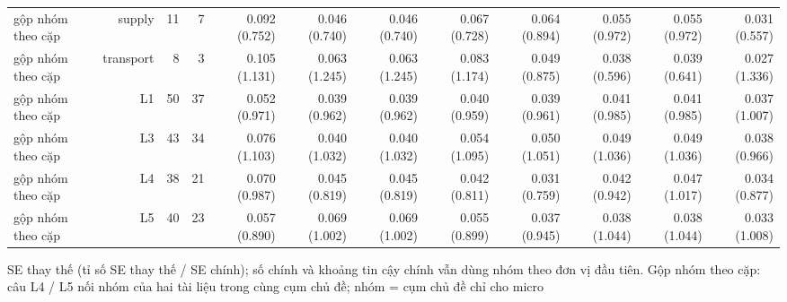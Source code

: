 \begin{table}[ht]
\begin{tabular}{lrrrrrrrrrrr}
gộp nhóm theo cặp & supply & 11 & 7 & 0.092 (0.752) & 0.046 (0.740) & 0.046 (0.740) & 0.067 (0.728) & 0.064 (0.894) & 0.055 (0.972) & 0.055 (0.972) & 0.031 (0.557) \\
gộp nhóm theo cặp & transport & 8 & 3 & 0.105 (1.131) & 0.063 (1.245) & 0.063 (1.245) & 0.083 (1.174) & 0.049 (0.875) & 0.038 (0.596) & 0.039 (0.641) & 0.027 (1.336) \\
gộp nhóm theo cặp & L1 & 50 & 37 & 0.052 (0.971) & 0.039 (0.962) & 0.039 (0.962) & 0.040 (0.959) & 0.039 (0.961) & 0.041 (0.985) & 0.041 (0.985) & 0.037 (1.007) \\
gộp nhóm theo cặp & L3 & 43 & 34 & 0.076 (1.103) & 0.040 (1.032) & 0.040 (1.032) & 0.054 (1.095) & 0.050 (1.051) & 0.049 (1.036) & 0.049 (1.036) & 0.038 (0.966) \\
gộp nhóm theo cặp & L4 & 38 & 21 & 0.070 (0.987) & 0.045 (0.819) & 0.045 (0.819) & 0.042 (0.811) & 0.031 (0.759) & 0.042 (0.942) & 0.047 (1.017) & 0.034 (0.877) \\
gộp nhóm theo cặp & L5 & 40 & 23 & 0.057 (0.890) & 0.069 (1.002) & 0.069 (1.002) & 0.055 (0.899) & 0.037 (0.945) & 0.038 (1.044) & 0.038 (1.044) & 0.033 (1.008) \\
\bottomrule
\end{tabular}
\par\smallskip\footnotesize SE thay thế (tỉ số SE thay thế / SE chính); số chính và khoảng tin cậy chính vẫn dùng nhóm theo đơn vị đầu tiên. Gộp nhóm theo cặp: câu L4 / L5 nối nhóm của hai tài liệu trong cùng cụm chủ đề; nhóm = cụm chủ đề chỉ cho micro
\end{table}

